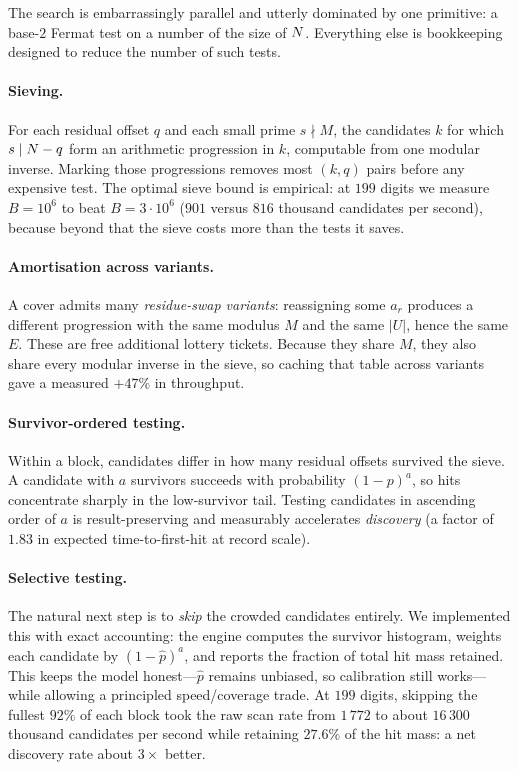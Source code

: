 The search is embarrassingly parallel and utterly dominated by one primitive: a
base-$2$ Fermat test on a number of the size of $N$. Everything else is
bookkeeping designed to reduce the number of such tests.

\paragraph{Sieving.} For each residual offset $q$ and each small prime
$s\nmid M$, the candidates $k$ for which $s\mid N-q$ form an arithmetic
progression in $k$, computable from one modular inverse. Marking those
progressions removes most $(k,q)$ pairs before any expensive test. The optimal
sieve bound is empirical: at $199$ digits we measure $B=10^{6}$ to beat
$B=3\cdot10^{6}$ ($901$ versus $816$ thousand candidates per second), because
beyond that the sieve costs more than the tests it saves.

\paragraph{Amortisation across variants.} A cover admits many
\emph{residue-swap variants}: reassigning some $a_r$ produces a different
progression with the same modulus $M$ and the same $|U|$, hence the same $E$.
These are free additional lottery tickets. Because they share $M$, they also
share every modular inverse in the sieve, so caching that table across variants
gave a measured $+47\%$ in throughput.

\paragraph{Survivor-ordered testing.} Within a block, candidates differ in how
many residual offsets survived the sieve. A candidate with $a$ survivors
succeeds with probability $(1-p)^{a}$, so hits concentrate sharply in the
low-survivor tail. Testing candidates in ascending order of $a$ is
result-preserving and measurably accelerates \emph{discovery} (a factor of
$1.83$ in expected time-to-first-hit at record scale).

\paragraph{Selective testing.} The natural next step is to \emph{skip} the
crowded candidates entirely. We implemented this with exact accounting: the
engine computes the survivor histogram, weights each candidate by
$(1-\hat p)^{a}$, and reports the fraction of total hit mass retained. This
keeps the model honest---$\hat p$ remains unbiased, so calibration still
works---while allowing a principled speed/coverage trade. At $199$ digits,
skipping the fullest $92\%$ of each block took the raw scan rate from
$1\,772$ to about $16\,300$ thousand candidates per second while retaining
$27.6\%$ of the hit mass: a net discovery rate about $3\times$ better.


